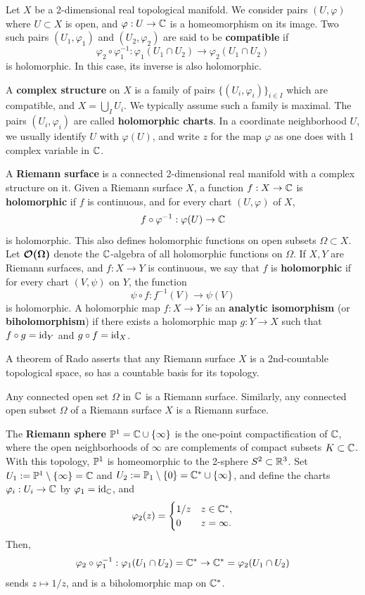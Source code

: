 \documentclass[11pt]{article}
\begin{document}
\begin{defn}
Let $X$ be a 2-dimensional real topological manifold. We consider pairs $(U,\varphi)$ where $U \subset X$ is open, and $\varphi:U\to \C$ is a homeomorphism on its image. Two such pairs $(U_1,\varphi_1)$ and $(U_2,\varphi_2)$ are said to be \textbf{compatible} if
$$\varphi_2 \circ \varphi_1^{-1} :\varphi_1(U_1\cap U_2) \to \varphi_2(U_1\cap U_2)$$
is holomorphic. In this case, its inverse is also holomorphic.

A \textbf{complex structure} on $X$ is a family of pairs $\{(U_i,\varphi_i)\}_{i \in I}$ which are compatible, and $X = \bigcup _IU_i$. We typically assume such a family is maximal. The pairs $(U_i,\varphi_i)$ are called \textbf{holomorphic charts}. In a coordinate neighborhood $U$, we usually identify $U$ with $\varphi(U)$, and write $z$ for the map $\varphi$ as one does with 1 complex variable in $\C$. 

A \textbf{Riemann surface} is a connected 2-dimensional real manifold with a complex structure on it. Given a Riemann surface $X$, a function $f:X \to \C$ is \textbf{holomorphic} if $f$ is continuous, and for every chart $(U,\varphi)$ of $X$, 
$$f \circ \varphi^{-1}: \varphi(U) \to \C$$
is holomorphic. This also defines holomorphic functions on open subsets $\Omega \subset X$. Let $\bm{\mc O(\Omega)}$ denote the $\C$-algebra of all holomorphic functions on $\Omega$. If $X,Y$ are Riemann surfaces, and $f:X \to Y$ is continuous, we say that $f$ is \textbf{holomorphic} if for every chart $(V,\psi)$ on $Y$, the function 
$$\psi\circ f:f^{-1}(V)\to \psi(V)$$
is holomorphic. A holomorphic map $f:X \to Y$ is an \textbf{analytic isomorphism} (or \textbf{biholomorphism}) if there exists a holomorphic map $g:Y \to X$ such that $f\circ g =\id_Y$ and $g \circ f=\id_X$.
\end{defn}

\begin{rmk}
    A theorem of Rado asserts that any Riemann surface $X$ is a 2nd-countable topological space, so has a countable basis for its topology.
\end{rmk}

\begin{ex}
    Any connected open set $\Omega$ in $\C$ is a Riemann surface. Similarly, any connected open subset $\Omega$ of a Riemann surface $X$ is a Riemann surface.
\end{ex}

\begin{ex}
    The \textbf{Riemann sphere} $\P^1=\C \cup \{\infty\}$ is the one-point compactification of $\C$, where the open neighborhoods of $\infty$ are complements of compact subsets $K \subset \C$. With this topology, $\P^1$ is homeomorphic to the 2-sphere $S^2 \subset \R^3$. Set $U_1 := \P^1\setminus \{\infty \} = \C$ and $U_2:=\P_1\setminus \{0\}=\C^*\cup \{\infty\}$, and define the charts $\varphi_i:U_i\to \C$ by $\varphi_1=\id_\C$, and
    $$\varphi_2(z) = \case{1/z & z \in \C^*, \\ 0 & z=\infty.}$$
    Then,
    $$\varphi_2\circ \varphi_1^{-1}:\varphi_1(U_1\cap U_2) = \C^* \to \C^* = \varphi_2(U_1 \cap U_2)$$
    sends $z \mapsto 1/z$, and is a biholomorphic map on $\C^*$.
\end{ex}
\end{document}
